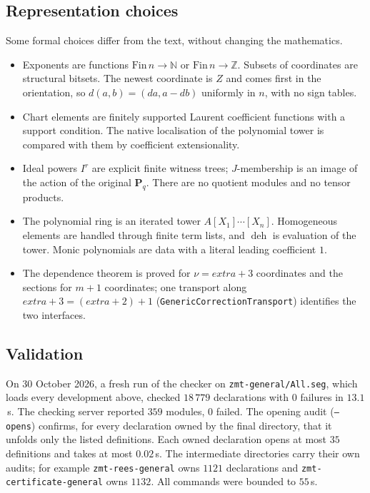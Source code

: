 \documentclass[11pt]{amsart}
\numberwithin{equation}{section}
\theoremstyle{definition}
\theoremstyle{remark}
\DeclareMathOperator{\deh}{deh}
\newcommand{\code}[1]{\texttt{#1}}
\newcommand{\ZZ}{\mathbb Z}
\begin{document}
\subsection{Representation choices}
Some formal choices differ from the text, without changing the
mathematics.
\begin{itemize}
\item Exponents are functions $\mathrm{Fin}\,n\to\mathbb N$ or
$\mathrm{Fin}\,n\to\ZZ$. Subsets of coordinates are structural bitsets.
The newest coordinate is $Z$ and comes first in the orientation, so
$d(a,b)=(da,a-db)$ uniformly in $n$, with no sign tables.
\item Chart elements are finitely supported Laurent coefficient
functions with a support condition. The native localisation of the
polynomial tower is compared with them by coefficient extensionality.
\item Ideal powers $I^r$ are explicit finite witness trees; $J$-membership
is an image of the action of the original $\mathbf P_q$.
There are no quotient modules and no tensor products.
\item The polynomial ring is an iterated tower $A[X_1]\cdots[X_n]$.
Homogeneous elements are handled through finite term lists, and
$\deh$ is evaluation of the tower. Monic polynomials are data with a
literal leading coefficient $1$.
\item The dependence theorem is proved for $\nu=\mathit{extra}+3$
coordinates and the sections for $m+1$ coordinates; one transport along
$\mathit{extra}+3=(\mathit{extra}+2)+1$ (\code{GenericCorrectionTransport})
identifies the two interfaces.
\end{itemize}

\subsection{Validation}
On 30 October 2026, a fresh run of the checker on
\code{zmt-general/All.seg}, which loads every development above,
checked $18\,779$ declarations with $0$ failures in $13.1$\,s. The
checking server reported $359$ modules, $0$ failed. The opening audit
(\code{--opens}) confirms, for every declaration owned by the final
directory, that it unfolds only the listed definitions. Each owned
declaration opens at most $35$ definitions and takes at most $0.02$\,s.
The intermediate directories carry their own audits; for example
\code{zmt-rees-general} owns $1121$ declarations and
\code{zmt-certificate-general} owns $1132$. All commands were bounded to
$55$\,s.
\end{document}
